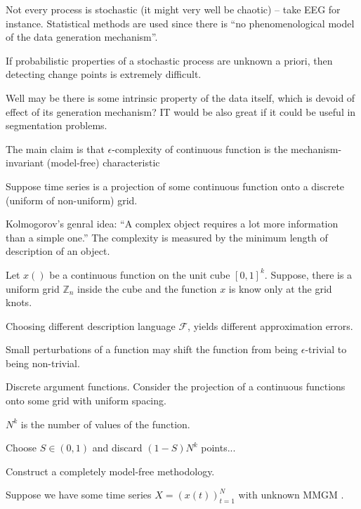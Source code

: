 \documentclass[a4paper]{article}
\newcommand{\clo}[1]{{\left [ #1 \right ]}}
\newcommand{\brac}[1]{{\left ( #1 \right )}}
\newcommand{\Fcal}{\mathcal{F}}
\begin{document}
Not every process is stochastic (it might very well be chaotic) -- take EEG for instance.
Statistical methods are used since there is ``no phenomenological model of the data generation mechanism''.

If probabilistic properties of a stochastic process are unknown a priori, then detecting change points is extremely difficult.

Well may be there is some intrinsic property of the data itself, which is devoid of effect of its generation mechanism? IT would be also great if it could be useful in segmentation problems.

The main claim is that $\epsilon$-complexity of continuous function is the mechanism-invariant (model-free) characteristic

Suppose time series is a projection of some continuous function onto a discrete (uniform of non-uniform) grid.

Kolmogorov's genral idea:
``A complex object requires a lot more information than a simple one.''
The complexity is measured by the minimum length of description of an object.

Let $x()$ be a continuous function on the unit cube $\clo{0,1}^k$.
Suppose, there is a uniform grid $\mathbb{Z}_n$ inside the cube and the function $x$ is know only at the grid knots.



Choosing different description language $\Fcal$, yields different approximation errors.

Small perturbations of a function may shift the function from being $\epsilon$-trivial to being non-trivial.


Discrete argument functions.
Consider the projection of a continuous functions onto some grid with uniform spacing.

$N^k$ is the number of values of the function.

Choose $S\in \brac{0,1}$ and discard $(1-S)N^k$ points...




Construct a completely model-free methodology.

Suppose we have some time series $X = \brac{x(t)}_{t=1}^N$ with unknown MMGM .

\end{document}
